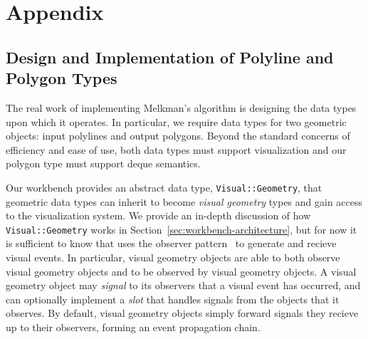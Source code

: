 
\section{Appendix}

% 
% 
% 
% 
% 
% 
% 
% 

\subsection{Design and Implementation of Polyline and Polygon Types}
\label{sec:polyline-polygon}

The real work of implementing Melkman's algorithm is designing the data types
upon which it operates. In particular, we require data types for two geometric
objects: input polylines and output polygons. Beyond the standard concerns of
efficiency and ease of use, both data types must support visualization and our
polygon type must support deque semantics.

Our workbench provides an abstract data type, \texttt{Visual::Geometry}, that
geometric data types can inherit to become \emph{visual geometry} types and gain
access to the visualization system. We provide an in-depth discussion of how
\texttt{Visual::Geometry} works in Section~\ref{sec:workbench-architecture}, but
for now it is sufficient to know that uses the observer
pattern~\cite{gamma1994design} to generate and recieve visual events. In
particular, visual geometry objects are able to both observe visual geometry
objects and to be observed by visual geometry objects. A visual geometry object
may \emph{signal} to its observers that a visual event has occurred, and can
optionally implement a \emph{slot} that handles signals from the objects that it
observes. By default, visual geometry objects simply forward signals they
recieve up to their observers, forming an event propagation chain.


